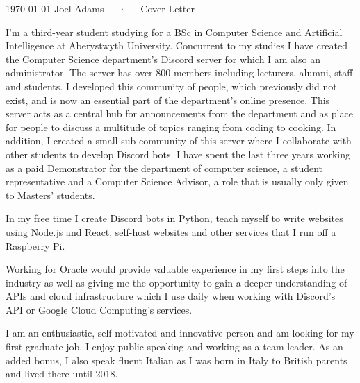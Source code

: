 \documentclass[11pt, a4paper]{awesome-cv}
\begin{document}
\makecvheader[R]

\makecvfooter
  {\today}
  {Joel Adams~~~·~~~Cover Letter}
  {}

\makelettertitle

\begin{cvletter}

I'm a third-year student studying for a BSc in Computer Science and Artificial Intelligence at Aberystwyth University. Concurrent to my studies I have created the Computer Science department's Discord server for which I am also an administrator. The server has over 800 members including lecturers, alumni, staff and students. I developed this community of people, which previously did not exist, and is now an essential part of the department's online presence. This server acts as a central hub for announcements from the department and as place for people to discuss a multitude of topics ranging from coding to cooking. In addition, I created a small sub community of this server where I collaborate with other students to develop Discord bots. I have spent the last three years working as a paid Demonstrator for the department of computer science, a student representative and a Computer Science Advisor, a role that is usually only given to Masters’ students.

In my free time I create Discord bots in Python, teach myself to write websites using Node.js and React, self-host websites and other services that I run off a Raspberry Pi.

Working for Oracle would provide valuable experience in my first steps into the industry as well as giving me the opportunity to gain a deeper understanding of APIs and cloud infrastructure which I use daily when working with Discord's API or Google Cloud Computing's services. 

I am an enthusiastic, self-motivated and innovative person and am looking for my first graduate job. I enjoy public speaking and working as a team leader. As an added bonus, I also speak fluent Italian as I was born in Italy to British parents and lived there until 2018. 


\end{cvletter}


\makeletterclosing
\end{document}

